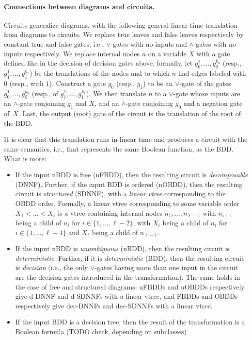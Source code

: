 \paragraph*{Connections between diagrams and
circuits.} 
Circuits generalize diagrams, with
the following general linear-time translation
from diagrams to circuits. We replace true
leaves and false leaves respectively by
constant true and false gates, i.e.,
$\lor$-gates with no inputs and $\land$-gates
with no inputs respectively. We replace
internal nodes $n$ on a variable $X$ with a
gate defined like in the decision of decision
gates above; formally, let $g^1_0,\ldots, g^{k_0}_0$ (resp., $g^1_1,\ldots, g^{k_1}_1$)
be the translations of the nodes and
to which $n$ had edges labeled
with $0$ (resp., with $1$).
Construct a gate $g_0$ (resp., $g_1$) to be an $\lor$-gate of the gates $g^1_0,\ldots, g^{k_0}_0$ (resp., of $g^1_1,\ldots, g^{k_1}_1$).
We then translate
$n$ to a $\lor$-gate whose inputs are an
$\land$-gate conjoining $g_1$ and $X$,
and an $\land$-gate conjoining $g_0$
and a negation gate of~$X$. Last, the output (root) gate of the
circuit is the translation of the root of the
BDD.

It is clear that this translation runs in
linear time and produces a circuit with the
same semantics, i.e., that represents the same
Boolean function, as the BDD. What is more:
\begin{itemize}
  \item If the input nBDD is free (nFBDD),
    then the resulting circuit is
    \emph{decomposable} (DNNF). Further, if
    the input BDD is ordered (nOBDD), then the
    resulting circuit is \emph{structured}
    (SDNNF), with a \emph{linear vtree}
    corresponding to the OBDD order. Formally,
    a linear vtree corresponding to some
    variable order $X_1< \ldots < X_\ell$ is a
    vtree containing internal nodes
    $n_1,\ldots,n_{\ell-1}$ with $n_{i+1}$
    being a child of $n_i$ for $i\in
    \{1,\ldots,\ell-2\}$, with $X_i$ being a
    child of $n_i$ for $i\in
    \{1,\ldots,\ell-1\}$ and $X_\ell$ being a
    child of $n_{\ell-1}$.
    \item If the input nBDD  is \emph{unambiguous} (uBDD), then the resulting circuit is \emph{deterministic}. Further, if it is \emph{deterministic}  (BDD), then the resulting circuit is \emph{decision} (i.e., the only $\lor$-gates having more than one input in the circuit are the decision gates introduced in the transformation). The same holds in the case of free and structured diagrams: uFBDDs and uOBDDs respectively give d-DNNF and d-SDNNFs with a linear vtree, and FBDDs and OBDDs respectively give dec-DNNFs and dec-SDNNFs with a linear vtree.
    \item If the input BDD is a decision tree, then the result of the transformation is a Boolean formula (TODO check, depending on subclasses)
\end{itemize}

